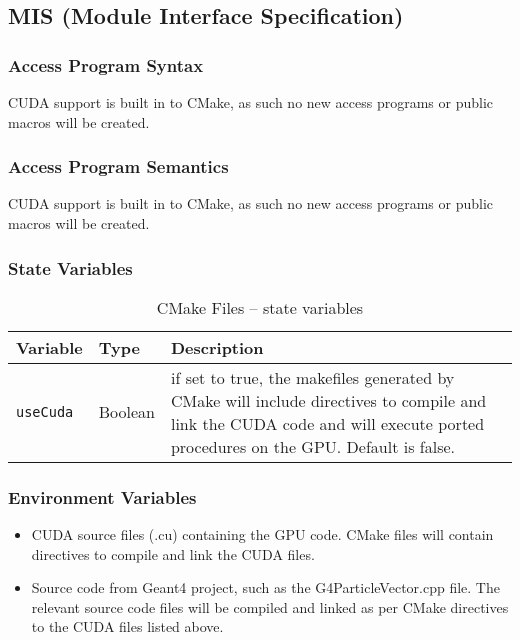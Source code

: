 \documentclass[12pt]{article}
\begin{document}
\subsection{MIS (Module Interface Specification)}
\subsubsection{Access Program Syntax}%
CUDA support is built in to CMake, as such no new access programs or public macros will be created.

\subsubsection{Access Program Semantics}%
CUDA support is built in to CMake, as such no new access programs or public macros will be created.

\subsubsection{State Variables}%
\begin{table}[h]
\caption{CMake Files -- state variables}\label{Table_CMakeStateVariables}
\begin{tabularx}{\textwidth}{p{}p{}p{}}
\toprule
\bf Variable & \bf Type & \bf Description\\\midrule
\texttt{useCuda} & Boolean & if set to true, the makefiles generated by CMake will include directives to compile and link the CUDA code and will execute ported procedures on the GPU. Default is false.\\
\bottomrule
\end{tabularx}
\end{table}

\subsubsection{Environment Variables}%
\begin{itemize}
\item CUDA source files (.cu) containing the GPU code. CMake files will contain directives to compile and link the CUDA files.
\item Source code from Geant4 project, such as the G4ParticleVector.cpp file. The relevant source code files will be compiled and linked as per CMake directives to the CUDA files listed above.
\end{itemize}
\end{document}
